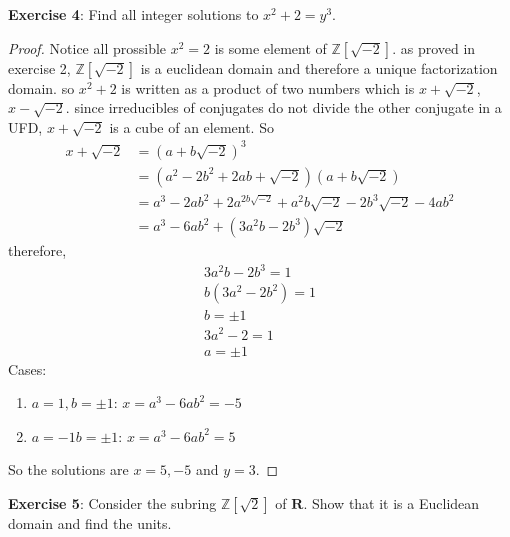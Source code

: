 \documentclass{article}
\begin{document}
\textbf{Exercise 4}: Find all integer solutions to $x^{2} + 2 = y^{3}$.
\begin{proof}
	Notice all prossible $x^{2} = 2$ is some element of $\mathbb{Z}[\sqrt{-2}]$. 
	as proved in exercise 2, $\mathbb{Z}[\sqrt{-2}]$ is a euclidean domain and therefore a unique factorization domain. so $x^{2} + 2$ is written as a product of two numbers which is $x + \sqrt{-2}$, $x - \sqrt{-2}$. since irreducibles of conjugates do not divide the other conjugate in a UFD, $x + \sqrt{-2}$ is a cube of an element. So 
	\begin{align*}
		x + \sqrt{-2} &= (a + b\sqrt{-2})^{3} \\
			      &= (a^{2} - 2b^{2} + 2ab +\sqrt{-2})(a + b\sqrt{-2}) \\
			      &= a^{3} - 2ab^{2} + 2a^{2b\sqrt{-2}} + a^{2}b\sqrt{-2} - 2b^{3}\sqrt{-2} - 4ab^{2} \\
			      &= a^{3} - 6ab^{2} + (3a^{2}b - 2b^{3})\sqrt{-2}
	\end{align*}
	therefore, 
	\begin{align*}
		3a^{2}b - 2b^{3} = 1 \\
		b(3a^{2} - 2b^{2}) = 1 \\
		b = \pm 1 \\
		3a^{2} - 2 = 1 \\
		a = \pm 1
	\end{align*}
	Cases:
	\begin{enumerate}
		\item $a = 1, b = \pm 1$: $x = a^{3} - 6ab^{2} = -5$ \\

		\item $a = -1 b = \pm 1$: $x = a^{3} - 6ab^{2} = 5$
	\end{enumerate}
	So the solutions are $x = 5, -5$ and $y = 3$.
\end{proof}
\textbf{Exercise 5}: Consider the subring $\mathbb{Z}[\sqrt{2}]$ of $\textbf{R}$. Show that it is a Euclidean domain and find the units.
\end{document}
